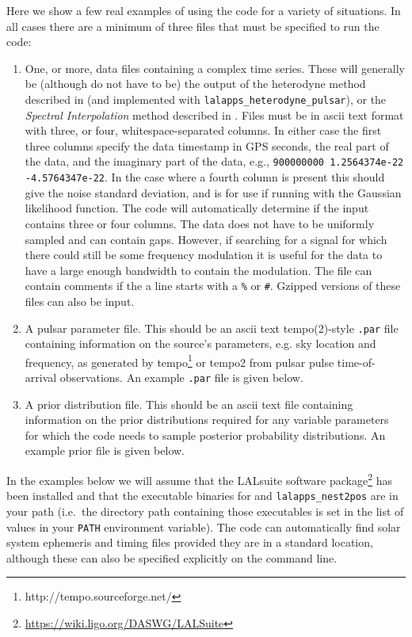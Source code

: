 Here we show a few real examples of using the code for a variety of situations. In all cases there are a minimum of
three files that must be specified to run the code:
\begin{enumerate}
 \item One, or more, data files containing a complex time series. These will generally be (although do not have to be) the output
 of the heterodyne method described in \citep{2005PhRvD..72j2002D} (and implemented with {\tt lalapps\_heterodyne\_pulsar}), or
 the {\it Spectral Interpolation} method described in \citep{2017CQGra..34a5010D}. Files must be in ascii text format with three, or
 four, whitespace-separated columns. In either case the first three columns specify the data timestamp in GPS seconds, the real part of
 the data, and the imaginary part of the data, e.g., \verb|900000000 1.2564374e-22 -4.5764347e-22|. In the case where a fourth column
 is present this should give the noise standard deviation, and is for use if running with the Gaussian likelihood function. The code will
 automatically determine if the input contains three or four columns. The data does not have to be uniformly sampled and can 
 contain gaps. However, if searching for a signal for which there could still be some frequency modulation it is useful for the data to have a large
 enough bandwidth to contain the modulation. The file can contain comments if the a line starts with a \verb|%| or \verb|#|. Gzipped versions of these
 files can also be input.
 \item A pulsar parameter file. This should be an ascii text {\sc tempo(2)}-style \verb|.par| file containing information on the
 source's parameters, e.g. sky location and frequency, as generated by {\sc tempo}\footnote{http://tempo.sourceforge.net/} or
 {\sc tempo2} \citep{2006MNRAS.369..655H}  from pulsar pulse time-of-arrival observations. An example \verb|.par| file is given below.
 \item A prior distribution file. This should be an ascii text file containing information on the prior distributions
 required for any variable parameters for which the code needs to sample posterior probability distributions. An example
 prior file is given below.
\end{enumerate}

In the examples below we will assume that the LALsuite software package\footnote{\url{https://wiki.ligo.org/DASWG/LALSuite}} has
been installed and that the executable binaries for \lppen and {\tt lalapps\_nest2pos} are in your path (i.e.\ the directory path containing those
executables is set in the list of values in your {\tt PATH} environment variable). The code can automatically find solar system ephemeris and timing
files provided they are in a standard location, although these can also be specified explicitly on the command line.

